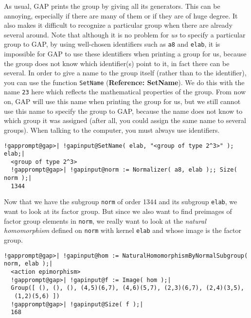 \documentclass[a4paper,11pt]{report}
\begin{document}
{{ As usual, \textsf{GAP} prints the group by giving all its generators. This can be annoying,
especially if there are many of them or if they are of huge degree. It also
makes it difficult to recognize a particular group when there are already
several around. Note that although it is no problem for \emph{us} to specify a particular group to \textsf{GAP}, by using well-chosen identifiers such as \texttt{a8} and \texttt{elab}, it is impossible for \textsf{GAP} to use these identifiers when printing a group for us, because the group does
not know which identifier(s) point to it, in fact there can be several. In
order to give a name to the group itself (rather than to the identifier), you
can use the function \texttt{SetName} (\textbf{Reference: SetName}). We do this with the name \texttt{2\texttt{}3} here which reflects the mathematical properties of the group. From now on, \textsf{GAP} will use this name when printing the group for us, but we still cannot use
this name to specify the group to \textsf{GAP}, because the name does not know to which group it was assigned (after all,
you could assign the same name to several groups). When talking to the
computer, you must always use identifiers. 

 
\begin{Verbatim}[commandchars=!@|,fontsize=\small,frame=single,label=Example]
  !gapprompt@gap>| !gapinput@SetName( elab, "<group of type 2^3>" ); elab;|
  <group of type 2^3>
  !gapprompt@gap>| !gapinput@norm := Normalizer( a8, elab );; Size( norm );|
  1344
\end{Verbatim}
 

  Now that we have the subgroup \texttt{norm} of order 1344 and its subgroup \texttt{elab}, we want to look at its factor group. But since we also want to find
preimages of factor group elements in \texttt{norm}, we really want to look at the \emph{natural homomorphism} defined on \texttt{norm} with kernel \texttt{elab} and whose image is the factor group. 

 
\begin{Verbatim}[commandchars=!@|,fontsize=\small,frame=single,label=Example]
  !gapprompt@gap>| !gapinput@hom := NaturalHomomorphismByNormalSubgroup( norm, elab );|
  <action epimorphism>
  !gapprompt@gap>| !gapinput@f := Image( hom );|
  Group([ (), (), (), (4,5)(6,7), (4,6)(5,7), (2,3)(6,7), (2,4)(3,5), 
   (1,2)(5,6) ])
  !gapprompt@gap>| !gapinput@Size( f );|
  168
\end{Verbatim}
 

}}
\end{document}
